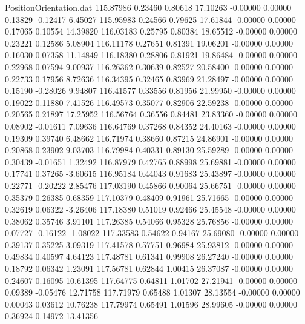 \begin{filecontents}{PositionOrientation.dat}
 115.87986    0.23460    0.80618    17.10263   -0.00000    0.00000    0.13829   -0.12417    6.45027
 115.95983    0.24566    0.79625    17.61844   -0.00000    0.00000    0.17065    0.10554   14.39820
 116.03183    0.25795    0.80384    18.65512   -0.00000    0.00000    0.23221    0.12586    5.08904
 116.11178    0.27651    0.81391    19.06201   -0.00000    0.00000    0.16030    0.07358   11.14849
 116.18380    0.28806    0.81921    19.86484   -0.00000    0.00000    0.22968    0.07594    9.00937
 116.26362    0.30639    0.82527    20.58400   -0.00000    0.00000    0.22733    0.17956    8.72636
 116.34395    0.32465    0.83969    21.28497   -0.00000    0.00000    0.15190   -0.28026    9.94807
 116.41577    0.33556    0.81956    21.99950   -0.00000    0.00000    0.19022    0.11880    7.41526
 116.49573    0.35077    0.82906    22.59238   -0.00000    0.00000    0.20565    0.21897   17.25952
 116.56764    0.36556    0.84481    23.83360   -0.00000    0.00000    0.08902   -0.01611    7.09636
 116.64769    0.37268    0.84352    24.40163   -0.00000    0.00000    0.19309    0.39740    6.48662
 116.71974    0.38660    0.87215    24.86901   -0.00000    0.00000    0.20868    0.23902    9.03703
 116.79984    0.40331    0.89130    25.59289   -0.00000    0.00000    0.30439   -0.01651    1.32492
 116.87979    0.42765    0.88998    25.69881   -0.00000    0.00000    0.17741    0.37265   -3.60615
 116.95184    0.44043    0.91683    25.43897   -0.00000    0.00000    0.22771   -0.20222    2.85476
 117.03190    0.45866    0.90064    25.66751   -0.00000    0.00000    0.35379    0.26385    0.68359
 117.10379    0.48409    0.91961    25.71665   -0.00000    0.00000    0.32619    0.06322   -3.26406
 117.18380    0.51019    0.92466    25.45548   -0.00000    0.00000    0.38062    0.35746    3.91101
 117.26385    0.54066    0.95328    25.76856   -0.00000    0.00000    0.07727   -0.16122   -1.08022
 117.33583    0.54622    0.94167    25.69080   -0.00000    0.00000    0.39137    0.35225    3.09319
 117.41578    0.57751    0.96984    25.93812   -0.00000    0.00000    0.49834    0.40597    4.64123
 117.48781    0.61341    0.99908    26.27240   -0.00000    0.00000    0.18792    0.06342    1.23091
 117.56781    0.62844    1.00415    26.37087   -0.00000    0.00000    0.24607    0.16095   10.61395
 117.64775    0.64811    1.01702    27.21941   -0.00000    0.00000    0.09389   -0.05476   12.71758
 117.71979    0.65488    1.01307    28.13554   -0.00000    0.00000    0.00043    0.03612   10.76238
 117.79974    0.65491    1.01596    28.99605   -0.00000    0.00000    0.36924    0.14972   13.41356

\end{filecontents}
